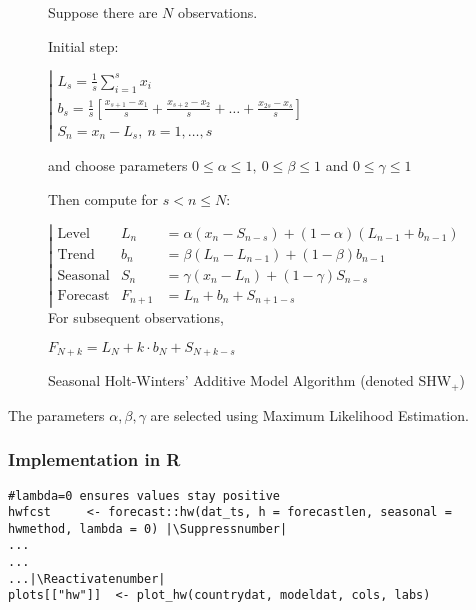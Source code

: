 \begin{figure}[H]
\centering
\begin{tcolorbox}[width=.65\textwidth]%

Suppose there are $N$ observations.

Initial step:

$\left|\begin{array}{l}
L_s = \frac1s \sum_{i=1}^s x_i \\
b_s = \frac1s \left[\frac{x_{s+1}-x_1}{s}+\frac{x_{s+2}-x_2}{s}+\dots+\frac{x_{2s}-x_s}{s}\right]\\
S_n  = x_n-L_s, \ n=1,\dots,s
\end{array}\right.$

and choose parameters $0\leq\alpha\leq1,\ 0\leq\beta\leq1$ and $0\leq\gamma\leq1$

Then compute for $s<n\leq N$:

$\left|\begin{array}{lll}
\text{Level} &       L_n & = \alpha (x_n-S_{n-s})+(1-\alpha)(L_{n-1}+b_{n-1})\\
\text{Trend} &      b_n & = \beta(L_n-L_{n-1})+(1-\beta)b_{n-1}\\
\text{Seasonal} & S_n & = \gamma (x_n-L_n) + (1-\gamma)S_{n-s}\\
\text{Forecast} & F_{n+1} & = L_n+b_n+S_{n+1-s}
\end{array}\right.$
For subsequent observations,

$F_{N+k}=L_N+k\cdot b_N+S_{N+k-s}$
\label{SHWx}
\end{tcolorbox}
\caption{Seasonal Holt-Winters' Additive Model Algorithm (denoted SHW$_{+}$)}
\end{figure}

The parameters $\alpha,\beta,\gamma$ are selected using Maximum Likelihood Estimation.

\subsubsection{Implementation in R}

\begin{lstlisting}[breaklines = true, escapeinside=||, tabsize = 4, caption = {Algorithm for HoltWinters Model}]
#lambda=0 ensures values stay positive
hwfcst     <- forecast::hw(dat_ts, h = forecastlen, seasonal = hwmethod, lambda = 0) |\Suppressnumber|
...
...
...|\Reactivatenumber|
plots[["hw"]]  <- plot_hw(countrydat, modeldat, cols, labs)
\end{lstlisting}

